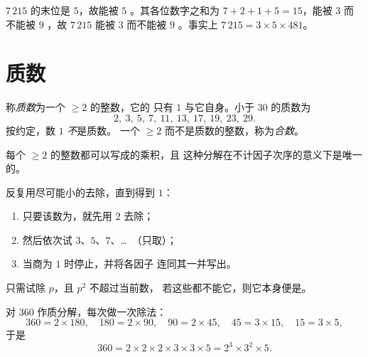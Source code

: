 \begin{example}
$7\,215$ 的末位是 $5$，故能被 $5$ 。其各位数字之和为
$7 + 2 + 1 + 5 = 15$，能被 $3$ 而不能被 $9$ ，故 $7\,215$
能被 $3$ 而不能被 $9$ 。事实上 $7\,215 = 3 \times 5 \times 481$。
\end{example}

\section{质数}

\begin{definition}[质数]\label{def:g9:arith:prime}
称\emph{质数}为一个 $\geq 2$ 的整数，它的
只有 $1$ 与它自身。小于 $30$ 的质数为
\[
2,\ 3,\ 5,\ 7,\ 11,\ 13,\ 17,\ 19,\ 23,\ 29 .
\]
按约定，数 $1$ \emph{不}是质数。
一个 $\geq 2$ 而不是质数的整数，称为\emph{合数}。
\end{definition}

\begin{theorem}[质因数分解]\label{thm:g9:arith:factorization}
每个 $\geq 2$ 的整数都可以写成的乘积，且
这种分解在不计因子次序的意义下是唯一的。
\end{theorem}
\admitted

\begin{method}[整数的质因数分解]\label{met:g9:arith:factorization}
反复用尽可能小的去除，直到得到 $1$：
\begin{enumerate}
  \item 只要该数为，就先用 $2$ 去除；
  \item 然后依次试 $3$、$5$、$7$、\dots\ （只取）；
  \item 当商为 $1$ 时停止，并将各因子
        连同其一并写出。
\end{enumerate}
只需试除 $p$，且 $p^2$ 不超过当前数，
若这些都不能它，则它本身便是。
\end{method}

\begin{example}\label{ex:g9:arith:factorization}
对 $360$ 作质分解，每次做一次除法：
\[
360 = 2 \times 180, \quad
180 = 2 \times 90, \quad
90 = 2 \times 45, \quad
45 = 3 \times 15, \quad
15 = 3 \times 5,
\]
于是
\[
360 = 2 \times 2 \times 2 \times 3 \times 3 \times 5 = 2^3 \times 3^2
\times 5 .
\]
\end{example}

